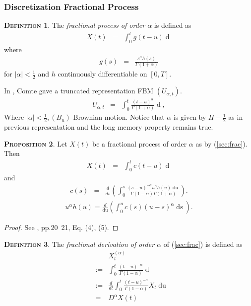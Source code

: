 \documentclass[a4paper, twoside, 11pt]{article}
\theoremstyle{definition}
\newtheorem{definition}{\scshape Definition}[section]
\newtheorem{proposition}[definition]{\scshape Proposition}
\newcommand{\brkt}[1]{\left({#1} \right)}
\begin{document}
\subsubsection{Discretization Fractional Process}
\begin{definition}
  The \emph{fractional process of order $\alpha$}  is defined as
  \begin{eqnarray}
	X(t) &=&  \int_0^{t} g(t - u) \mathop{dB_u}
	\label{sec:frac}
  \end{eqnarray}
  where
  \begin{eqnarray*}
	g(s) &=& \frac{s^\alpha h(s)}{\Gamma(1+\alpha)}
  \end{eqnarray*}
  for $|\alpha| < \frac{1}{2}$ and $h$ continuously differentiable on $[0, T]$.
\end{definition}
In \cite{comte}, Comte gave a truncated representation FBM $(U_{\alpha,t})$.
\begin{eqnarray}
  U_{\alpha,t} &=& \int_0^t \frac{(t-u)^\alpha}{\Gamma(1+\alpha)}\mathop{dB_u}, 
  \label{<sec:cc1>}
\end{eqnarray}
Where $|\alpha| < \frac{1}{2}, (B_u)$ Brownian motion. Notice that $\alpha$ is given by $H-\frac{1}{2}$ as in previous representation and the long memory property remains true.

\begin{proposition}
  Let $X(t)$ be a fractional process of order $\alpha$ as by (\ref{sec:frac}). Then
  \begin{eqnarray}
	X(t) &=& \int_0^t c(t-u)\mathop{dU_{\alpha,u}}
	\label{sec:bb1}
  \end{eqnarray}
  and 
  \begin{eqnarray}
	c(s) &=& \frac{d}{ds}\brkt{\int_0^s \frac{(s-u)^{-\alpha}u^\alpha h(u) \mathop{du}}{\Gamma(1-\alpha)\Gamma(1+\alpha)}}.
\label{sec:frac2}
  \end{eqnarray}
  \begin{eqnarray}
	u^\alpha h(u) = \frac{d}{\mathop{du}}\brkt{\int_0^u c(s) (u-s)^\alpha \mathop{ds}}.
	\label{sec:frac3}
  \end{eqnarray}
\end{proposition}

\begin{proof}
  See \cite{core}, pp.20~21, Eq. (4), (5).
\end{proof}
\begin{definition}
  The \emph{fractional derivation of order $\alpha$} of (\ref{sec:frac}) is defined as
  \begin{eqnarray}
   && X^{(\alpha)}_t\nonumber\\
	&:=&  \int_0^t \frac{(t-u)^{-\alpha}}{\Gamma(1-\alpha)} \mathop{dX_{t}}\nonumber\\
    &:=&  \frac{d}{dt}\int_0^t \frac{(t-u)^{-\alpha}}{\Gamma(1-\alpha)} X_{t} \mathop{du} \nonumber\\
	&=& D^{\alpha} X(t)
	\label{sec:cc4}
  \end{eqnarray}
\end{definition}
\end{document}
